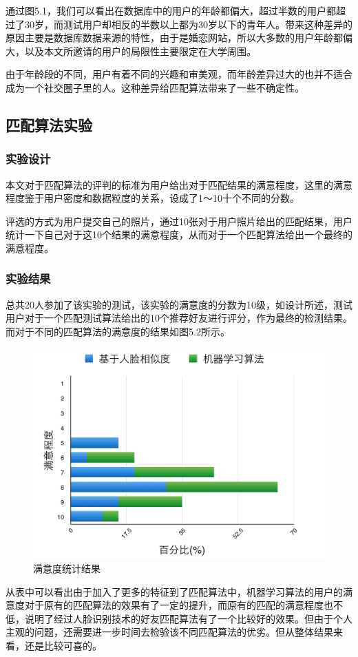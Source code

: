 通过图5.1，我们可以看出在数据库中的用户的年龄都偏大，超过半数的用户都超过了30岁，而测试用户却相反的半数以上都为30岁以下的青年人。带来这种差异的原因主要是数据库数据来源的特性，由于是婚恋网站，所以大多数的用户年龄都偏大，以及本文所邀请的用户的局限性主要限定在大学周围。

由于年龄段的不同，用户有着不同的兴趣和审美观，而年龄差异过大的也并不适合成为一个社交圈子里的人。这种差异给匹配算法带来了一些不确定性。


\subsection{匹配算法实验}
\subsubsection{实验设计}
本文对于匹配算法的评判的标准为用户给出对于匹配结果的满意程度，这里的满意程度鉴于用户密度和数据粒度的关系，设成了1～10十个不同的分数。

评选的方式为用户提交自己的照片，通过10张对于用户照片给出的匹配结果，用户统计一下自己对于这10个结果的满意程度，从而对于一个匹配算法给出一个最终的满意程度。
\subsubsection{实验结果}
总共20人参加了该实验的测试，该实验的满意度的分数为10级，如设计所述，测试用户对于一个匹配测试算法给出的10个推荐好友进行评分，作为最终的检测结果。而对于不同的匹配算法的满意度的结果如图5.2所示。
\begin{figure}[h]
\begin{minipage}[t]{1\linewidth} 
\centering
\includegraphics[width=\textwidth]{img/chap5/exp2.png}
\caption{满意度统计结果\label{instagram}}
\end{minipage}
\end{figure}
从表中可以看出由于加入了更多的特征到了匹配算法中，机器学习算法的用户的满意度对于原有的匹配算法的效果有了一定的提升，而原有的匹配的满意程度也不低，说明了经过人脸识别技术的好友匹配算法有了一个比较好的效果。但由于个人主观的问题，还需要进一步时间去检验该不同匹配算法的优劣。但从整体结果来看，还是比较可喜的。
